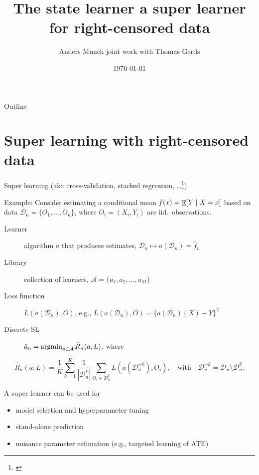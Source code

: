 \documentclass[smaller]{beamer}\usepackage{listings}
\author{Anders Munch \newline \small joint work with Thomas Gerds}
\date{\today}
\title{The state learner \newline \normalsize a super learner for right-censored data}
\begin{document}
\maketitle
\begin{frame}{Outline}
\tableofcontents
\end{frame}

\section{Super learning with right-censored data}
\label{sec:org42945cb}
\begin{frame}[label={sec:orga8c5284}]{Super learning \small (aka cross-validation, stacked regression, \ldots{}\footnote{\cite{stone1974cross,geisser1975predictive,wolpert1992stacked,breiman1996stacked,van2007super}})}
\small

\color{bblue}Example: \color{black} Consider estimating a conditional mean \(f(x) = {\mathop{{\mathbb{E}}}}[Y \mid X=x]\) based on data \(\mathcal{D}_n = \{O_1, \dots, O_n\}\), where \(O_i = (X_i, Y_i)\) are iid.~observations.

\vfill

\begin{description}
\item[{Learner}] algorithm \(a\) that produces estimates, \(\mathcal{D}_n \mapsto
  a(\mathcal{D}_n) = \hat f_n\)
\item[{Library}] collection of learners, \(\mathcal{A} = \{a_1, a_2, \dots, a_M \}\)
\item[{Loss function}] \(L(a(\mathcal{D}_n), O)\), e.g., \(L(a(\mathcal{D}_n), O)
  = \{a(\mathcal{D}_n)(X) - Y\}^2\) \pause
\item[{Discrete SL}] \(\hat{a}_n = \operatorname*{\arg\!\min}_{a\in\mathcal A}\hat{R}_n(a;
  L)\), where
\end{description}
\begin{equation*}
  \hat{R}_n(a; L) =
  \frac{1}{K}\sum_{k=1}^{K}
  \frac{1}{| \mathcal{D}_n^{k} |}\sum_{O_i \in \mathcal{D}_n^{k}}
  L
  {
    \left(
      a{ (\mathcal{D}_n^{-k})}
      , O_i
    \right)
  },
  \quad \text{with} \quad
  \mathcal{D}_n^{-k} = \mathcal{D}_n \setminus \mathcal{D}_n^{k}.
\end{equation*}


\vfill \pause

A super learner can be used for

\begin{itemize}
\item model selection and hyperparameter tuning
\item stand-alone prediction
\item nuisance parameter estimation (e.g., targeted learning of ATE)
\end{itemize}
\end{frame}
\end{document}
